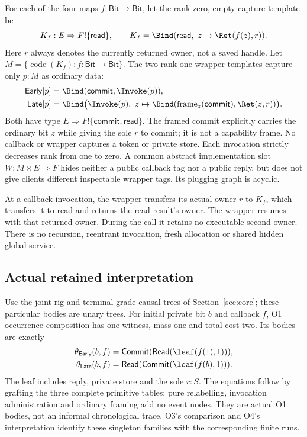 For each of the four maps $f:\mathsf{Bit}\to\mathsf{Bit}$, let the
rank-zero, empty-capture template be
\[
K_f:E\Rightarrow F!\{\mathsf{read}\},\qquad
K_f=\Bind(\mathsf{read},\ z\mapsto\Ret(f(z),r)).
\]
Here $r$ always denotes the currently returned owner, not a saved handle.
Let $M=\{\operatorname{code}(K_f):f:\mathsf{Bit}\to\mathsf{Bit}\}$.
The two rank-one wrapper templates capture only $p:M$ as ordinary data:
\begin{align*}
\mathsf{Early}[p]&=\Bind(\mathsf{commit},\Invoke(p)),\\
\mathsf{Late}[p]&=\Bind\bigl(\Invoke(p),\ z\mapsto
 \Bind(\operatorname{frame}_{z}(\mathsf{commit}),\Ret(z,r))\bigr).
\end{align*}
Both have type $E\Rightarrow F!\{\mathsf{commit},\mathsf{read}\}$.
The framed commit explicitly carries the ordinary bit $z$ while giving
the sole $r$ to commit; it is not a capability frame. No callback or
wrapper captures a token or private store. Each invocation strictly
decreases rank from one to zero. A common abstract implementation slot
$W:M\times E\Rightarrow F$ hides neither a public callback tag nor a
public reply, but does not give clients different inspectable wrapper
tags. Its plugging graph is acyclic.

At a callback invocation, the wrapper transfers its actual owner $r$ to
$K_f$, which transfers it to read and returns the read result's owner.
The wrapper resumes with that returned owner. During the call it retains
no executable second owner. There is no recursion, reentrant invocation,
fresh allocation or shared hidden global service.

\subsection{Actual retained interpretation}
Use the joint rig and terminal-grade causal trees of
Section~\ref{sec:core}; these particular bodies are unary trees.
For initial private bit $b$ and callback $f$, O1 occurrence composition
has one witness, mass one and total cost two. Its bodies are exactly
\begin{equation}\label{eq:I-bodies}
\begin{split}
\theta_{\mathsf{Early}}(b,f)
 &=\mathsf{Commit}(\mathsf{Read}(\leaf(f(1),1))),\\
\theta_{\mathsf{Late}}(b,f)
 &=\mathsf{Read}(\mathsf{Commit}(\leaf(f(b),1))).
\end{split}
\end{equation}
The leaf includes reply, private store and the sole $r:S$. The equations
follow by grafting the three complete primitive tables; pure relabelling,
invocation administration and ordinary framing add no event nodes.
They are actual O1 bodies, not an informal chronological trace. O3's
comparison and O4's interpretation identify these singleton families
with the corresponding finite runs.


